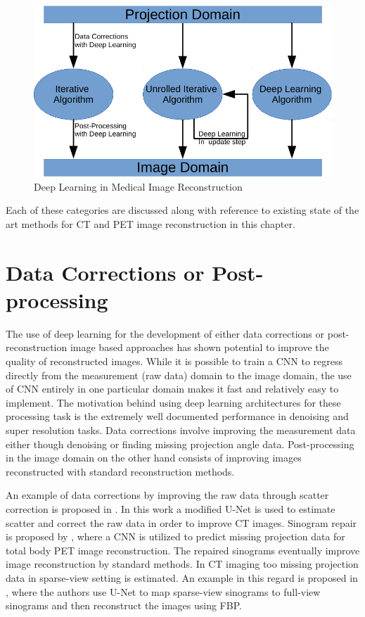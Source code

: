\begin{figure}[!htbp]
	\centering
	\includegraphics[width=0.8\linewidth]{./Figures/dl_mi.pdf}
	\caption{Deep Learning in Medical Image Reconstruction}
	\label{fig:dl}
\end{figure}


Each of these categories are discussed along with reference to existing state of the art methods for \ac{CT} and \ac{PET} image reconstruction in this chapter. 

\section{Data Corrections or Post-processing}

The use of deep learning for the development of either data corrections or post-reconstruction  image based approaches has shown potential to improve the quality of reconstructed images. While it is possible to train a \ac{CNN} to regress directly from the measurement (raw data) domain to the image domain, the use of \ac{CNN} entirely in one particular domain makes it fast and relatively easy to implement. The motivation behind using deep learning architectures for these processing task is the extremely well documented performance in denoising and super resolution tasks. Data corrections involve improving the measurement data either though denoising or finding missing projection angle data. Post-processing in the image domain on the other hand consists of improving images reconstructed with standard reconstruction methods. 


An example of data corrections by improving the raw data through scatter correction is proposed in \cite{maier2018deep}. In this work a modified U-Net is used to estimate scatter and correct the raw data in order to improve \ac{CT} images. Sinogram repair is proposed by \cite{whiteley2019cnn}, where a \ac{CNN} is utilized to predict missing projection data for total body \ac{PET} image reconstruction. The repaired sinograms eventually improve image reconstruction by standard methods. In \ac{CT} imaging too missing projection data in sparse-view setting is estimated. An example in this regard is proposed in \cite{lee2018deep}, where the authors use U-Net to map sparse-view sinograms to full-view sinograms and then reconstruct the images using \ac{FBP}. 



